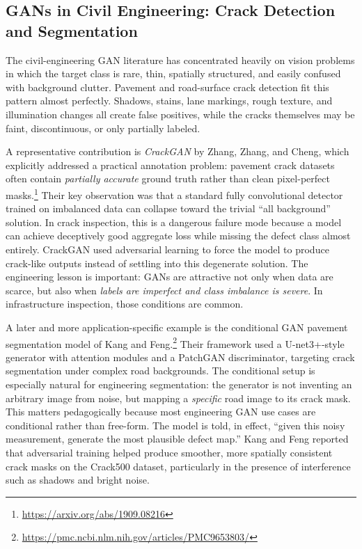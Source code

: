 \documentclass[12pt]{article}
\begin{document}
\subsection{GANs in Civil Engineering: Crack Detection and Segmentation}

The civil-engineering GAN literature has concentrated heavily on vision problems in which the target class is rare, thin, spatially structured, and easily confused with background clutter. Pavement and road-surface crack detection fit this pattern almost perfectly. Shadows, stains, lane markings, rough texture, and illumination changes all create false positives, while the cracks themselves may be faint, discontinuous, or only partially labeled.

A representative contribution is \emph{CrackGAN} by Zhang, Zhang, and Cheng, which explicitly addressed a practical annotation problem: pavement crack datasets often contain \emph{partially accurate} ground truth rather than clean pixel-perfect masks.\footnote{\url{https://arxiv.org/abs/1909.08216}} Their key observation was that a standard fully convolutional detector trained on imbalanced data can collapse toward the trivial ``all background'' solution. In crack inspection, this is a dangerous failure mode because a model can achieve deceptively good aggregate loss while missing the defect class almost entirely. CrackGAN used adversarial learning to force the model to produce crack-like outputs instead of settling into this degenerate solution. The engineering lesson is important: GANs are attractive not only when data are scarce, but also when \emph{labels are imperfect and class imbalance is severe}. In infrastructure inspection, those conditions are common.

A later and more application-specific example is the conditional GAN pavement segmentation model of Kang and Feng.\footnote{\url{https://pmc.ncbi.nlm.nih.gov/articles/PMC9653803/}} Their framework used a U-net3+-style generator with attention modules and a PatchGAN discriminator, targeting crack segmentation under complex road backgrounds. The conditional setup is especially natural for engineering segmentation: the generator is not inventing an arbitrary image from noise, but mapping a \emph{specific} road image to its crack mask. This matters pedagogically because most engineering GAN use cases are conditional rather than free-form. The model is told, in effect, ``given this noisy measurement, generate the most plausible defect map.'' Kang and Feng reported that adversarial training helped produce smoother, more spatially consistent crack masks on the Crack500 dataset, particularly in the presence of interference such as shadows and bright noise.
\end{document}
